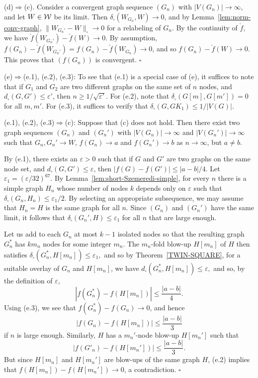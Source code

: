 \documentclass[12pt]{article}
\numberwithin{equation}{section}
\def\eps{\varepsilon}
\begin{document}
\medskip

(d)$\Rightarrow$(c). Consider a convergent graph sequence $(G_n)$
with $|V(G_n)|\to\infty$, and let $W\in{\cal W}$ be its limit. Then
$\delta_\square(W_{G_n},W)\to 0$, and by
Lemma~\ref{lem:norm-conv-graph}, $\|W_{G_n'}-W\|_\square\to 0$ for a
relabeling of $G_n$. By the continuity of $\check{f}$, we have
$\check{f}(W_{G_n'})-\check{f}(W)\to 0$. By assumption,
$f(G_n)-\check{f}(W_{G_n'})=f(G_n)-\check{f}(W_{G_n}) \to 0$, and so
$f(G_n)-\check{f}(W)\to 0$. This proves that $(f(G_n))$ is
convergent. \hfill$\square$

\bigskip


(e)$\Rightarrow$(e.1), (e.2), (e.3): To see that (e.1) is a special
case of (e), it suffices to note that if $G_1$ and $G_2$ are two
different graphs on the same set of $n$ nodes, and
$d_\square(G,G')\le\eps'$, then $n\ge 1/\sqrt{\eps'}$. For (e.2),
note that $\delta_\square(G[m],G[m'])=0$ for all $m,m'$. For (e.3),
it suffices to verify that $\delta_\square(G,GK_1)\le 1/|V(G)|$.

(e.1), (e.2), (e.3)$\Rightarrow$(c): Suppose that (c) does not hold.
Then there exist two graph sequences $(G_n)$ and $(G_n')$ { with
$|V(G_n)|\to\infty$ and $|V(G_n')|\to\infty$} such that $G_n,G_n'\to
W$, $f(G_n)\to a$ and $f(G_n')\to b$ as $n\to\infty$, but $a\neq b$.

By (e.1), there exists an $\eps>0$ such that if $G$ and $G'$ are two
graphs on the same node set, and $d_\square(G,G')\leq\eps$, then
$|f(G)-f(G')|\leq|a-b|/4$. Let $\eps_1={(\eps/32)^{67}}$. By
Lemma~\ref{lem:short-Szemeredi-simple}, for every $n$ there is a
simple graph $H_n$ whose number of nodes $k$ depends only on $\eps$
such that $\delta_\square(G_n, H_n)\leq \eps_1/2$. By selecting an
appropriate subsequence, we may assume that $H_n=H$ is the same graph
for all $n$. Since $(G_n)$ and $(G_n')$ have the same limit, it
follows that $\delta_\square(G_n',H)\le \eps_1$ for all $n$ that are
large enough.

Let us add to each $G_n$ at most $k-1$ isolated nodes so that the
resulting graph $G^*_n$ has $km_n$ nodes for some integer $m_n$. The
$m_n$-fold blow-up $H[m_n]$ of $H$ then satisfies
$
\delta_\square(G^*_n, H[m_n]) \le \eps_1,
$
and so by Theorem~\ref{TWIN-SQUARE}, for a suitable overlay of $G_n$
and $H[m_n]$, we have
$
d_\square(G^*_n, H[m_n]) \le \eps,
$
and so, by the definition of $\eps$,
\[
|f(G^*_n)-f(H[m_n])| \le \frac{|a-b|}{4}.
\]
Using (e.3), we see that $f(G_n^*)-f(G_n)\to 0$, and hence
\[
|f(G_n)-f(H[m_n])| \le \frac{|a-b|}{3}
\]
if $n$ is large enough. Similarly, $H$ has a $m_n'$-node blow-up
$H[m_n']$ such that
\[
|f(G'_n)-f(H[m_n'])| \le \frac{|a-b|}{3}.
\]
But since $H[m_n]$ and $H[m_n']$ are blow-ups of the same graph $H$,
(e.2) implies that $f(H[m_n])-f(H[m_n'])\to 0$, a contradiction.
\hfill$\square$
\medskip
\end{document}
